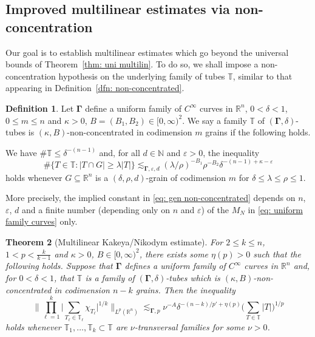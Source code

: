 \documentclass[reqno]{amsart}
\numberwithin{equation}{section}
\newcommand{\N}{\mathbb{N}}
\newcommand{\R}{\mathbb{R}}
\newcommand{\T}{\mathbb{T}}
\newcommand{\bdGamma}{\boldsymbol{\Gamma}}
\theoremstyle{plain}
\newtheorem{theorem}{Theorem}[section]
\theoremstyle{definition}
\newtheorem{definition}[theorem]{Definition}
\begin{document}
\subsection{Improved multilinear estimates via non-concentration} Our goal is to establish multilinear estimates which go beyond the universal bounds of Theorem~\ref{thm: uni multilin}. To do so, we shall impose a non-concentration hypothesis on the underlying family of tubes $\T$, similar to that appearing in Definition~\ref{dfn: non-concentrated}. 


\begin{definition} Let $\bdGamma$ define a uniform family of $C^{\infty}$ curves in $\R^n$, $0 < \delta < 1$, $0 \leq m \leq n$ and $\kappa > 0$, $B = (B_1, B_2) \in [0,\infty)^2$. We say a family $\T$ of $(\bdGamma, \delta)$-tubes is $(\kappa, B)$-non-concentrated in codimension $m$ grains if the following holds.\medskip

\noindent We have $\#\T \leq \delta^{-(n-1)}$ and, for all $d \in \N$ and $\varepsilon > 0$, the inequality
    \begin{equation}\label{eq: gen non-concentrated}
        \#\big\{ T \in \T : | T \cap G| \geq \lambda |T| \big\} \lesssim_{\bdGamma, \varepsilon, d} (\lambda/\rho)^{-B_1} \rho^{-B_2} \delta^{-(n-1) + \kappa - \varepsilon}
    \end{equation}
   holds whenever $G \subseteq \R^n$ is a $(\delta, \rho, d)$-grain of codimension $m$ for $\delta \leq \lambda \leq \rho \leq 1$.
\end{definition}

More precisely, the implied constant in \eqref{eq: gen non-concentrated} depends on $n$, $\varepsilon$, $d$ and a finite number (depending only on $n$ and $\varepsilon$) of the $M_N$ in \eqref{eq: uniform family curves} only. 


\begin{theorem}[Multilinear Kakeya/Nikodym estimate]\label{thm: multilin Kak/Nik} For $2 \leq k \leq n$,  $1 < p < \frac{k}{k-1}$ and $\kappa > 0$, $B \in [0,\infty)^2$, there exists some $\eta(p) > 0$ such that the following holds. Suppose that $\bdGamma$ defines a uniform family of $C^{\infty}$ curves in $\R^n$ and, for $0 < \delta < 1$, that $\T$ is a family of $(\bdGamma, \delta)$-tubes which is $(\kappa, B)$-non-concentrated in codimension $n-k$ grains. Then the inequality
\begin{equation}\label{eq: multilin Kak/Nik}
    \Big\|\prod_{\ell = 1}^k \big| \sum_{T_{\ell} \in \T_{\ell}} \chi_{T_{\ell}} \big|^{1/k} \Big\|_{L^p(\R^n)} \lesssim_{\bdGamma,p} \nu^{-A} \delta^{-(n - k)/p' + \eta(p)} \Big(\sum_{T \in \T} |T| \Big)^{1/p}
\end{equation}
holds whenever $\T_1, \dots, \T_k \subset \T$ are $\nu$-transversal families for some $\nu > 0$. 
\end{theorem}
\end{document}
